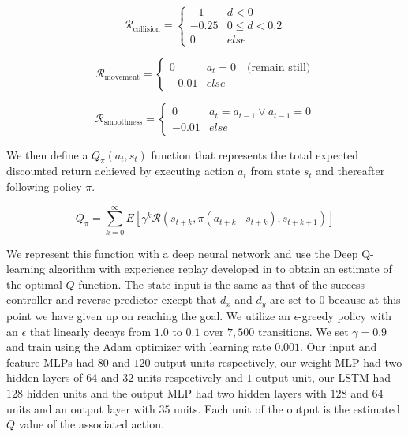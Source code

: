 \documentclass[letterpaper, 10 pt, conference]{ieeeconf}  %
\begin{document}
		\begin{equation}\label{eq:rcollision}
			\mathcal{R}_{\text{collision}} = \begin{cases}
				-1      &   d < 0\\
				-0.25   &   0 \leq d < 0.2\\
				0       &   else
			\end{cases}
		\end{equation}
		
		\begin{equation}\label{eq:rmovement}
			\mathcal{R}_{\text{movement}} = \begin{cases}
			0       &   a_t = 0 \quad\text{(remain still)}\\
			-0.01   &   else
			\end{cases}
		\end{equation}
		
		\begin{equation}\label{eq:rsmoothness}
			\mathcal{R}_{\text{smoothness}} = \begin{cases}
			0       &   a_t = a_{t-1} \vee a_{t-1} = 0\\
			-0.01   &   else
			\end{cases}
		\end{equation}
		
		We then define a $Q_{\pi}(a_t, s_t)$ function that represents the total expected discounted return achieved by executing action $a_t$ from state $s_t$ and thereafter following policy $\pi$. 
		
		\begin{equation}\label{eq:q}
			Q_{\pi} = 
			\sum_{k=0}^{\infty}E[\gamma^k \mathcal{R}(s_{t+k}, \pi(a_{t+k} \mid s_{t+k}), s_{t+k+1})]
		\end{equation}
		
		We represent this function with a deep neural network and use the Deep Q-learning algorithm with experience replay developed in \cite{dqn} to obtain an estimate of the optimal $Q$ function. The state input is the same as that of the success controller and reverse predictor except that $d_x$ and $d_y$ are set to $0$ because at this point we have given up on reaching the goal. We utilize an $\epsilon$-greedy policy with an $\epsilon$ that linearly decays from $1.0$ to $0.1$ over $7,500$ transitions. We set $\gamma=0.9$ and train using the Adam optimizer with learning rate $0.001$. Our input and feature MLPs had $80$ and $120$ output units respectively, our weight MLP had two hidden layers of $64$ and $32$ units respectively and $1$ output unit, our LSTM had $128$ hidden units and the output MLP had two hidden layers with $128$ and $64$ units and an output layer with $35$ units. Each unit of the output is the estimated $Q$ value of the associated action.
		
\end{document}
